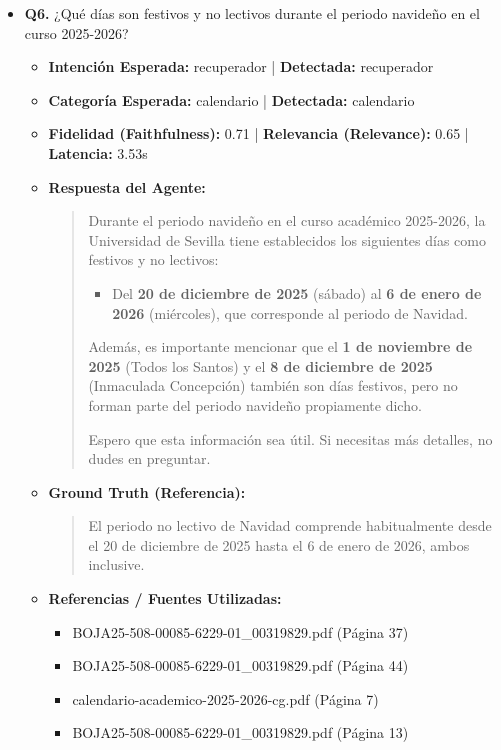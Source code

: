 \documentclass[12pt,a4paper,oneside]{report}
\begin{document}
\begin{itemize}
  
\item \textbf{Q6.} ¿Qué días son festivos y no lectivos durante el periodo navideño en el curso 2025-2026? \\
        \begin{itemize}
          \item \textbf{Intención Esperada:} recuperador | \textbf{Detectada:} recuperador
          \item \textbf{Categoría Esperada:} calendario | \textbf{Detectada:} calendario
          \item \textbf{Fidelidad (Faithfulness):} 0.71 | \textbf{Relevancia (Relevance):} 0.65 | \textbf{Latencia:} 3.53s
          \item \textbf{{Respuesta del Agente:}} \\
                \begin{quote}
Durante el periodo navideño en el curso académico 2025-2026, la Universidad de Sevilla tiene establecidos los siguientes días como festivos y no lectivos:

\begin{itemize}
  \item Del \textbf{20 de diciembre de 2025} (sábado) al \textbf{6 de enero de 2026} (miércoles), que corresponde al periodo de Navidad.
\end{itemize}

Además, es importante mencionar que el \textbf{1 de noviembre de 2025} (Todos los Santos) y el \textbf{8 de diciembre de 2025} (Inmaculada Concepción) también son días festivos, pero no forman parte del periodo navideño propiamente dicho.

Espero que esta información sea útil. Si necesitas más detalles, no dudes en preguntar.
                \end{quote}
          \item \textbf{{Ground Truth (Referencia):}} \\
                \begin{quote}
El periodo no lectivo de Navidad comprende habitualmente desde el 20 de diciembre de 2025 hasta el 6 de enero de 2026, ambos inclusive.
                \end{quote}
          \item \textbf{{Referencias / Fuentes Utilizadas:}} \\
                \begin{itemize}
                  \item BOJA25-508-00085-6229-01\_00319829.pdf (Página 37)
                  \item BOJA25-508-00085-6229-01\_00319829.pdf (Página 44)
                  \item calendario-academico-2025-2026-cg.pdf (Página 7)
                  \item BOJA25-508-00085-6229-01\_00319829.pdf (Página 13)
                \end{itemize}
        \end{itemize}


\end{itemize}
\end{document}
